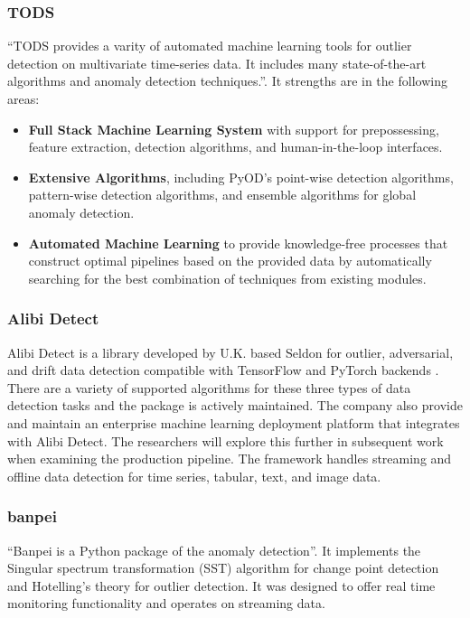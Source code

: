 \subsubsection{TODS}
\enquote{TODS provides a varity of automated machine learning tools for outlier detection on multivariate time-series data. It includes many state-of-the-art algorithms and anomaly detection techniques.}\parencite{Lai_2021_TODS}. It strengths are in the following areas:
\begin{itemize}
    \item \textbf{Full Stack Machine Learning System} with support for prepossessing, feature extraction, detection algorithms, and human-in-the-loop interfaces.
    \item \textbf{Extensive Algorithms}, including PyOD's point-wise detection algorithms, pattern-wise detection algorithms, and ensemble algorithms for global anomaly detection.
    \item \textbf{Automated Machine Learning} to provide knowledge-free processes that construct optimal pipelines based on the provided data by automatically searching for the best combination of techniques from existing modules.
\end{itemize}

\subsubsection{Alibi Detect}
Alibi Detect is a library developed by U.K. based Seldon for outlier, adversarial, and drift data detection compatible with TensorFlow and PyTorch backends \parencite{alibi-detect}. There are a variety of supported algorithms for these three types of data detection tasks and the package is actively maintained. The company also provide and maintain an enterprise machine learning deployment platform that integrates with Alibi Detect. The researchers will explore this further in subsequent work when examining the production pipeline. The framework handles streaming and offline data detection for time series, tabular, text, and image data. 

\subsubsection{banpei}

\enquote{Banpei is a Python package of the anomaly detection}\parencite{banpei}. It implements the Singular spectrum transformation (SST) algorithm for change point detection and Hotelling's theory for outlier detection. It was designed to offer real time monitoring functionality and operates on streaming data.

